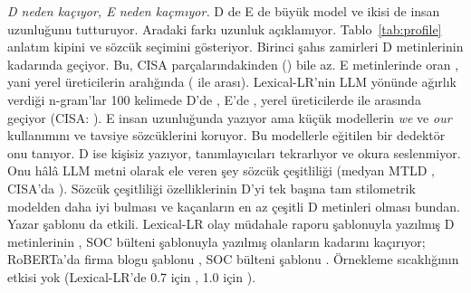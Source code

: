 \documentclass[journal]{IEEEtran}
\begin{document}
\emph{D neden kaçıyor, E neden kaçmıyor.} D de E de büyük model ve ikisi de insan uzunluğunu tutturuyor. Aradaki
farkı uzunluk açıklamıyor. Tablo~\ref{tab:profile} anlatım kipini ve sözcük seçimini gösteriyor. Birinci şahıs
zamirleri D metinlerinin \ProfpctDFirst{} kadarında geçiyor. Bu, CISA parçalarındakinden (\ProfpctHumanFirst{}) bile
az. E metinlerinde oran \ProfpctEFirst{}, yani yerel üreticilerin aralığında (\ProfpctBFirst{} ile
\ProfpctCFirst{} arası). Lexical-LR'nin LLM yönünde ağırlık verdiği n-gram'lar 100 kelimede D'de \ProfDCuesLlm{},
E'de \ProfECuesLlm{}, yerel üreticilerde \ProfCCuesLlm{} ile \ProfACuesLlm{} arasında geçiyor (CISA:
\ProfHumanCuesLlm{}). E insan
uzunluğunda yazıyor ama küçük modellerin \emph{we} ve \emph{our} kullanımını ve tavsiye sözcüklerini koruyor. Bu
modellerle eğitilen bir dedektör onu tanıyor. D ise kişisiz yazıyor, tanımlayıcıları tekrarlıyor ve okura
seslenmiyor. Onu hâlâ LLM metni olarak ele veren şey sözcük çeşitliliği (medyan MTLD \MedMtldD{}, CISA'da
\MedMtldHuman{}). Sözcük çeşitliliği özelliklerinin D'yi tek başına tam stilometrik modelden daha iyi bulması ve
kaçanların en az çeşitli D metinleri olması bundan. Yazar şablonu da etkili. Lexical-LR olay müdahale raporu
şablonuyla yazılmış D metinlerinin \DmissIncidentLexlr{}, SOC bülteni şablonuyla yazılmış olanların
\DmissSocLexlr{} kadarını kaçırıyor; RoBERTa'da firma blogu şablonu \DmissBlogTrans{}, SOC bülteni şablonu
\DmissSocTrans{}. Örnekleme sıcaklığının etkisi yok (Lexical-LR'de 0.7 için \DmisstempLowLexlr{}, 1.0 için
\DmisstempHighLexlr{}).
\end{document}
